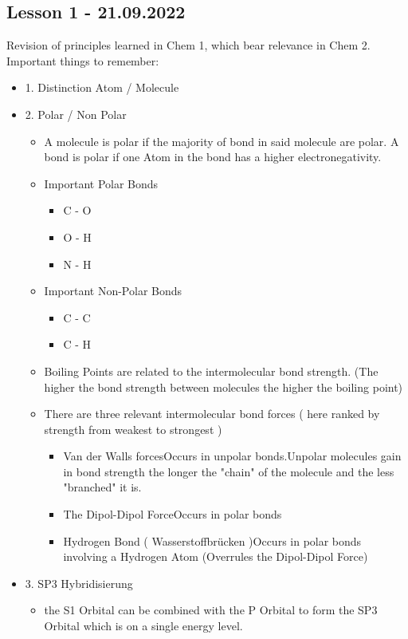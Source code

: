 \documentclass{article}
\begin{document}
\subsection{Lesson 1 - 21.09.2022}
Revision of principles learned in Chem 1, which bear relevance in Chem 2. \break
Important things to remember: \hfill
\begin{itemize}
    \item 1. Distinction Atom / Molecule
    \item 2. Polar / Non Polar
    \begin{itemize}
        \item A molecule is polar if the majority of bond in said molecule are polar. A bond is polar if one Atom in the bond has a higher electronegativity.
        \item Important Polar Bonds
        \begin{itemize}
            \item C - O
            \item O - H
            \item N - H
        \end{itemize}
        \item Important Non-Polar Bonds
        \begin{itemize}
            \item C - C
            \item C - H
        \end{itemize}
        \item Boiling Points are related to the intermolecular bond strength. (The higher the bond strength between molecules the higher the boiling point)
        \item There are three relevant intermolecular bond forces ( here ranked by strength from weakest to strongest )
        \begin{itemize}
            \item Van der Walls forces\hfill\break Occurs in unpolar bonds.\hfill\break Unpolar molecules gain in bond strength the longer the "chain" of the molecule and the less "branched" it is.
            \item The Dipol-Dipol Force\hfill\break Occurs in polar bonds\hfill
            \item Hydrogen Bond ( Wasserstoffbrücken )\hfill\break Occurs in polar bonds involving a Hydrogen Atom (Overrules the Dipol-Dipol Force)
        \end{itemize}
    \end{itemize}
    \item 3. SP3 Hybridisierung
    \begin{itemize}
        \item the S1 Orbital can be combined with the P Orbital to form the SP3 Orbital which is on a single energy level.
    \end{itemize}
\end{itemize}
\end{document}
